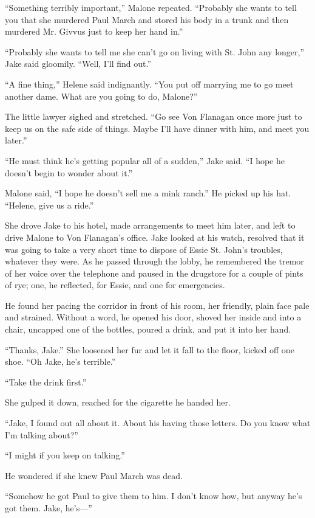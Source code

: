 \documentclass{novel}
\begin{document}
“Something terribly important,” Malone repeated. “Probably she wants to tell you that she murdered Paul March and stored his body in a trunk and then murdered Mr. Givvus just to keep her hand in.”

“Probably she wants to tell me she can’t go on living with St. John any longer,” Jake said gloomily. “Well, I’ll find out.”

“A fine thing,” Helene said indignantly. “You put off marrying me to go meet another dame. What are you going to do, Malone?”

The little lawyer sighed and stretched. “Go see Von Flanagan once more just to keep us on the safe side of things. Maybe I’ll have dinner with him, and meet you later.”

“He must think he’s getting popular all of a sudden,” Jake said. “I hope he doesn’t begin to wonder about it.”

Malone said, “I hope he doesn’t sell me a mink ranch.” He picked up his hat. “Helene, give us a ride.”

She drove Jake to his hotel, made arrangements to meet him later, and left to drive Malone to Von Flanagan’s office. Jake looked at his watch, resolved that it was going to take a very short time to dispose of Essie St. John’s troubles, whatever they were. As he passed through the lobby, he remembered the tremor of her voice over the telephone and paused in the drugstore for a couple of pints of rye; one, he reflected, for Essie, and one for emergencies.

He found her pacing the corridor in front of his room, her friendly, plain face pale and strained. Without a word, he opened his door, shoved her inside and into a chair, uncapped one of the bottles, poured a drink, and put it into her hand.

“Thanks, Jake.” She loosened her fur and let it fall to the floor, kicked off one shoe. “Oh Jake, he’s terrible.”

“Take the drink first.”

She gulped it down, reached for the cigarette he handed her.

“Jake, I found out all about it. About his having those letters. Do you know what I’m talking about?”

“I might if you keep on talking.”

He wondered if she knew Paul March was dead.

“Somehow he got Paul to give them to him. I don’t know how, but anyway he’s got them. Jake, he’s—”
\end{document}
